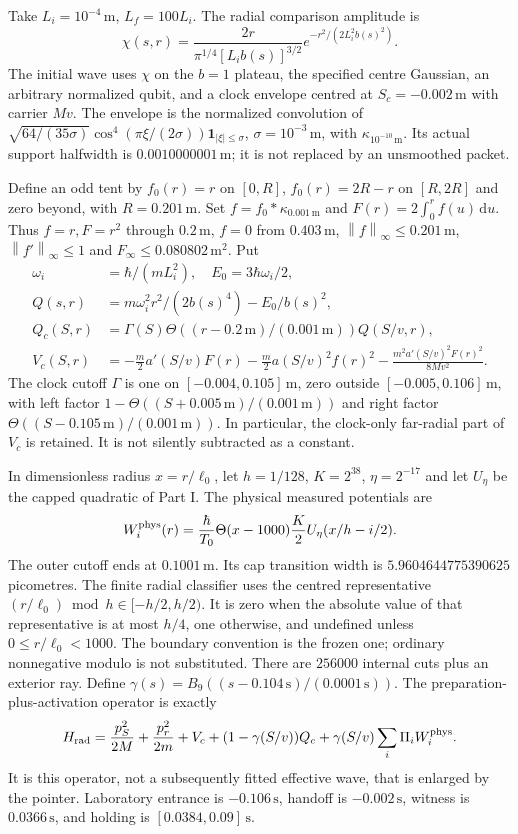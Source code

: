 \documentclass[11pt]{article}
\theoremstyle{definition}\newtheorem{definition}[theorem]{Definition}
\theoremstyle{remark}\newtheorem{remark}[theorem]{Remark}
\newcommand{\norm}[1]{\left\lVert#1\right\rVert}
\newcommand{\one}{\mathbf1}\newcommand{\R}{\mathbb R}\newcommand{\T}{\mathbb T}
\newcommand{\dd}{\,\mathrm d}\newcommand{\Imv}{\operatorname{Im}}\newcommand{\ii}{\mathrm i}
\begin{document}
Take $L_i=10^{-4}\,\mathrm m$, $L_f=100L_i$. The radial comparison
amplitude is
\[
 \chi(s,r)=\frac{2r}{\pi^{1/4}[L_i b(s)]^{3/2}}
             e^{-r^2/(2L_i^2b(s)^2)}.
\]
The initial wave uses $\chi$ on the $b=1$ plateau, the specified
centre Gaussian, an arbitrary normalized qubit, and a clock envelope
centred at $S_c=-0.002\,\mathrm m$ with carrier $Mv$. The envelope
is the normalized convolution of
$\sqrt{64/(35\sigma)}\cos^4(\pi\xi/(2\sigma))
\one_{|\xi|\le\sigma}$, $\sigma=10^{-3}\,\mathrm m$,
with $\kappa_{10^{-10}\,\mathrm m}$. Its actual support halfwidth is
$0.0010000001\,\mathrm m$; it is not replaced by an unsmoothed packet.

Define an odd tent by $f_0(r)=r$ on $[0,R]$, $f_0(r)=2R-r$ on
$[R,2R]$ and zero beyond, with $R=0.201\,\mathrm m$. Set
$f=f_0*\kappa_{0.001\,\mathrm m}$ and $F(r)=2\int_0^r f(u)\dd u$.
Thus $f=r,F=r^2$ through $0.2\,\mathrm m$, $f=0$ from
$0.403\,\mathrm m$, $\norm f_\infty\le0.201\,\mathrm m$,
$\norm{f'}_\infty\le1$ and $F_\infty\le0.080802\,\mathrm m^2$.
Put
\begin{align}
 \omega_i&=\hbar/(mL_i^2),\quad E_0=3\hbar\omega_i/2,\\
 Q(s,r)&=m\omega_i^2r^2/(2b(s)^4)-E_0/b(s)^2,\\
 Q_c(S,r)&=\Gamma(S)\Theta((r-0.2\,\mathrm m)/(0.001\,\mathrm m))Q(S/v,r),\\
 V_c(S,r)&=-\frac m2a'(S/v)F(r)-\frac m2a(S/v)^2 f(r)^2
       -\frac{m^2a'(S/v)^2F(r)^2}{8Mv^2}.\label{eq:Vc}
\end{align}
The clock cutoff $\Gamma$ is one on $[-0.004,0.105]\,\mathrm m$,
zero outside $[-0.005,0.106]\,\mathrm m$, with left factor
$1-\Theta((S+0.005\,\mathrm m)/(0.001\,\mathrm m))$ and right factor
$\Theta((S-0.105\,\mathrm m)/(0.001\,\mathrm m))$. In particular,
the clock-only far-radial part of $V_c$ is retained. It is not silently
subtracted as a constant.

In dimensionless radius $x=r/\ell_0$, let $h=1/128$, $K=2^{38}$,
$\eta=2^{-17}$ and let $U_\eta$ be the capped quadratic of Part I.
The physical measured potentials are
\[
 W_i^{\rm phys}(r)=\frac\hbar{T_0}\Theta(x-1000)
                         \frac K2 U_\eta(x/h-i/2).
\]
The outer cutoff ends at $0.1001\,\mathrm m$. Its cap transition
width is $5.9604644775390625$ picometres. The finite radial classifier uses the centred representative
$(r/\ell_0)\bmod h\in[-h/2,h/2)$. It is zero when the absolute
value of that representative is at most $h/4$, one otherwise, and
undefined unless $0\le r/\ell_0<1000$. The boundary convention is
the frozen one; ordinary nonnegative modulo is not substituted.
There are $256000$ internal cuts plus an exterior ray. Define
$\gamma(s)=B_9((s-0.104\,\mathrm s)/(0.0001\,\mathrm s))$.
The preparation-plus-activation operator is exactly
\begin{equation}\label{eq:Hrad}
 H_{\rm rad}=\frac{p_S^2}{2M}+\frac{p_r^2}{2m}+V_c
       +(1-\gamma(S/v))Q_c
       +\gamma(S/v)\sum_i\Pi_iW_i^{\rm phys}.
\end{equation}
It is this operator, not a subsequently fitted effective wave, that is
enlarged by the pointer. Laboratory entrance is $-0.106\,\mathrm s$,
handoff is $-0.002\,\mathrm s$, witness is $0.0366\,\mathrm s$,
and holding is $[0.0384,0.09]\,\mathrm s$.
\end{document}
